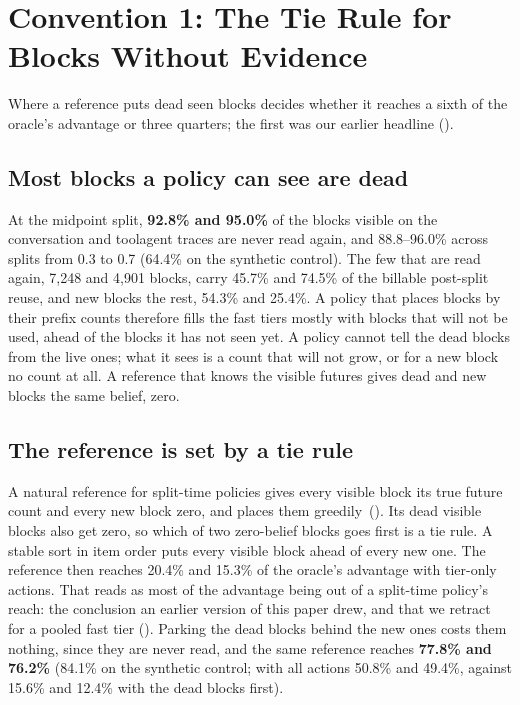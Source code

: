 \section{Convention 1: The Tie Rule for Blocks Without Evidence}
\label{sec:evidence}
Where a reference puts dead seen blocks decides whether it reaches a sixth of the oracle's advantage or three
quarters; the first was our earlier headline ().

\subsection{Most blocks a policy can see are dead}
\label{sec:dead}
At the midpoint split, \textbf{92.8\% and 95.0\%} of the blocks visible on the conversation and toolagent
traces are never read again, and 88.8--96.0\% across splits from 0.3 to 0.7 (64.4\% on the synthetic
control). The few that are read again, 7{,}248 and 4{,}901 blocks, carry 45.7\% and 74.5\% of the
billable post-split reuse, and new blocks the rest, 54.3\% and 25.4\%. A policy that places blocks by
their prefix counts therefore fills the fast tiers mostly with blocks that will not be used, ahead of the
blocks it has not seen yet. A policy cannot tell the dead blocks from the live ones; what it sees is a
count that will not grow, or for a new block no count at all. A reference that knows the visible futures
gives dead and new blocks the same belief, zero.

\subsection{The reference is set by a tie rule}
\label{sec:ties}
A natural reference for split-time policies gives every visible block its true future count and every
new block zero, and places them greedily~(). Its dead visible blocks also get zero, so
which of two zero-belief blocks goes first is a tie rule. A stable sort in item order puts every visible block
ahead of every new one. The reference then reaches 20.4\% and 15.3\% of the oracle's advantage with tier-only
actions. That reads as most of the advantage being out of a split-time policy's reach: the conclusion an
earlier version of this paper drew, and that we retract for a pooled fast tier (). Parking
the dead blocks behind the new ones costs them nothing, since they are never read, and the same reference
reaches \textbf{77.8\% and 76.2\%} (84.1\% on the
synthetic control; with all actions 50.8\% and 49.4\%, against 15.6\% and 12.4\% with the dead blocks first).

